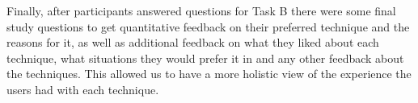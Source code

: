 Finally, after participants answered questions for Task B there were some final study questions to get quantitative feedback on their preferred technique and the reasons for it, as well as additional feedback on what they liked about each technique, what situations they would prefer it in and any other feedback about the techniques. This allowed us to have a more holistic view of the experience the users had with each technique.



